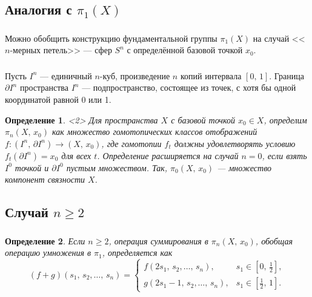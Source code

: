 \documentclass[c]{beamer}
\newtheorem{rdfn}{Определение}
\begin{document}
\subsection{Аналогия с  $\pi_1(X)$}
\begin{frame}
\frametitle{\insertsection}
\framesubtitle{\insertsubsection}
Можно обобщить конструкцию фундаментальной группы $\pi_1(X)$
на случай  <<$n$-мерных петель>> --- сфер $S^n$ с определённой
базовой точкой  $x_0$.
\end{frame}
\begin{frame}
\frametitle{\insertsection}
\framesubtitle{\insertsubsection}
	
Пусть $I^n$ --- единичный $n$-куб, произведение $n$ копий
интервала $[0,\,1]$. 
Граница $\partial I^n$ пространства $I^n$ --- подпространство,
состоящее из точек, с хотя бы одной координатой равной
0 или 1. 
\begin{rdfn}<2>
Для пространства $X$ с базовой точкой $x_0 \in X$,
определим $\pi_n (X,\,x_0)$ как множество гомотопических
классов отображений $f \colon (I^n,\,\partial I^n) \to 
(X,\,x_0)$, где гомотопии $f_t$ должны удовлетворять условию
$f_t(\partial I^n)=x_0$ для всех $t$. Определение
расширяется на случай $n=0$, если взять $I^0$ точкой и $\partial
I^0$ пустым множеством. Так, $\pi_0(X,\,x_0)$ --- множество
компонент связности $X$.
\end{rdfn}
\end{frame}
\subsection{Случай $n\ge 2$}
\begin{frame}
\frametitle{\insertsection}
\framesubtitle{\insertsubsection}
\begin{rdfn}
	Если $n\ge 2$, операция суммирования в $\pi_n(X,\,x_0)$,
обобщая операцию умножения в $\pi_1$, определяется как
\[
	(f+g)(s_1,\,s_2,\ldots,\,s_n)=
	\begin{cases}
		f(2s_1,\,s_2,\ldots,\,s_n), & s_1 \in \left[ 0,\,
		\frac{1}{2}\right], \\
			g(2s_1-1,\,s_2,\ldots,\, s_n), &
			s_1 \in \left[ \frac{1}{2},\, 1 \right]. 
	\end{cases}
\] 
\end{rdfn}
\end{frame}
\end{document}
